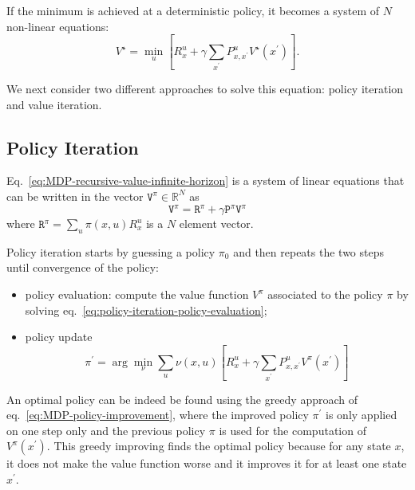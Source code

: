 If the minimum is achieved at a deterministic policy, it becomes a system of $N$ non-linear equations:
\begin{equation*}
  V^\star = \min_u \left[R^u_x + \gamma \sum_{x^\prime}P^u_{x,x^\prime} V^\star(x^\prime)\right].
\end{equation*}

We next consider two different approaches to solve this equation: policy iteration and value iteration.

\subsection{Policy Iteration}
\label{sec:MDP-policy-iteration}

Eq.~\eqref{eq:MDP-recursive-value-infinite-horizon} is a system of linear equations that can be written in the vector $\mathtt{V}^\pi\in\mathbb{R}^N$ as
\begin{equation}
  \label{eq:policy-iteration-policy-evaluation}
  \mathtt{V}^\pi = \mathtt{R}^\pi + \gamma \mathtt{P}^\pi \mathtt{V}^\pi
\end{equation}
where $\mathtt{R}^\pi = \sum_u \pi(x,u)R_x^u$ is a $N$ element vector.

Policy iteration starts by guessing a policy $\pi_0$ and then repeats the two steps until convergence of the policy:
\begin{itemize}
\item policy evaluation: compute the value function $V^\pi$ associated to the policy $\pi$ by solving eq.~\eqref{eq:policy-iteration-policy-evaluation};
\item policy update
  \begin{equation}
    \label{eq:MDP-policy-improvement}
    \pi^\prime = \arg \min_\nu \sum_u \nu(x,u)\left[R^u_x + \gamma \sum_{x^\prime}P^u_{x,x^\prime} V^\pi(x^\prime)\right]
  \end{equation}
\end{itemize}
An optimal policy can be indeed be found using the greedy approach of eq.~\eqref{eq:MDP-policy-improvement}, where the improved policy $\pi^\prime$ is only applied on one step only and the previous policy $\pi$ is used for the computation of $V^\pi(x^\prime)$. This greedy improving finds the optimal policy because for any state $x$, it does not make the value function worse and it improves it for at least one state $x^\prime$.

